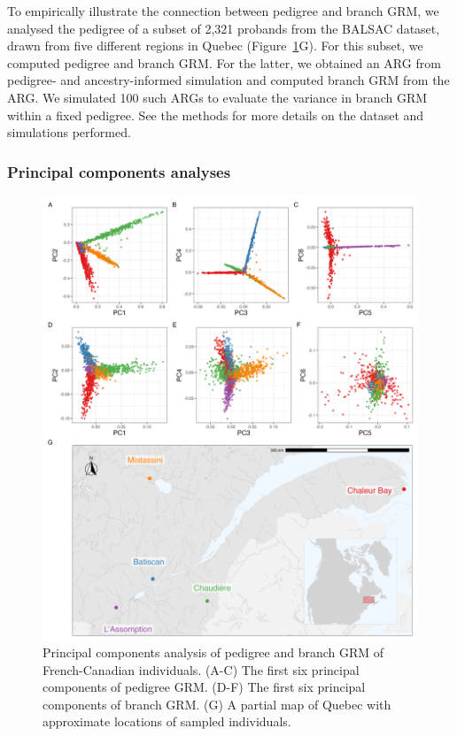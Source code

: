 To empirically illustrate the connection between pedigree and branch GRM,
we analysed the pedigree of a subset of 2,321 probands from the BALSAC dataset,
drawn from five different regions in Quebec (Figure~\ref{fig:PCA_map}G).
%
For this subset, we computed pedigree and branch GRM.
%
For the latter, we obtained an ARG from pedigree- and ancestry-informed simulation
and computed branch GRM from the ARG.
%
We simulated 100 such ARGs to evaluate the variance in branch GRM within a fixed pedigree.
See the methods for more details on the dataset and simulations performed.

\subsubsection{Principal components analyses}

\begin{figure}
    \centering
    \includegraphics[width = \textwidth]{Figures/map_and_pca_grid4.jpg}
    \caption{Principal components analysis of pedigree and branch GRM of French-Canadian individuals.
    (A-C) The first six principal components of pedigree GRM.
    (D-F) The first six principal components of branch GRM.
    (G) A partial map of Quebec with approximate locations of sampled individuals. \label{fig:PCA_map}}
\end{figure}

